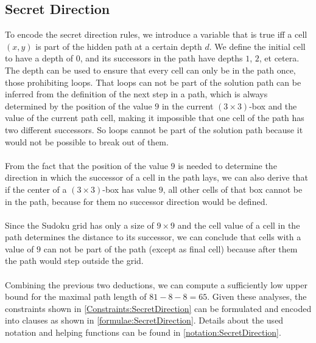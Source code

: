 \subsection{Secret Direction}
To encode the secret direction rules, we introduce a variable that is true iff a cell $(x,y)$ is part of the hidden path at a certain depth $d$. We define the initial cell to have a depth of $0$, and its successors in the path have depths $1$, $2$, et cetera. The depth can be used to ensure that every cell can only be in the path once, those prohibiting loops. That loops can not be part of the solution path can be inferred from the definition of the next step in a path, which is always determined by the position of the value $9$ in the current $(3\times3)$-box and the value of the current path cell, making it impossible that one cell of the path has two different successors. So loops cannot be part of the solution path because it would not be possible to break out of them.\\
\\
From the fact that the position of the value $9$ is needed to determine the direction in which the successor of a cell in the path lays, we can also derive that if the center of a $(3\times3)$-box has value $9$, all other cells of that box cannot be in the path, because for them no successor direction would be defined.\\
\\
Since the Sudoku grid has only a size of $9\times9$ and the cell value of a cell in the path determines the distance to its successor, we can conclude that cells with a value of $9$ can not be part of the path (except as final cell) because after them the path would step outside the grid.\\
\\
Combining the previous two deductions, we can compute a sufficiently low upper bound for the maximal path length of $81-8-8 = 65$. Given these analyses, the constraints shown in \ref{Constraints:SecretDirection} can be formulated and encoded into clauses as shown in \ref{formulae:SecretDirection}. Details about the used notation and helping functions can be found in \ref{notation:SecretDirection}.



